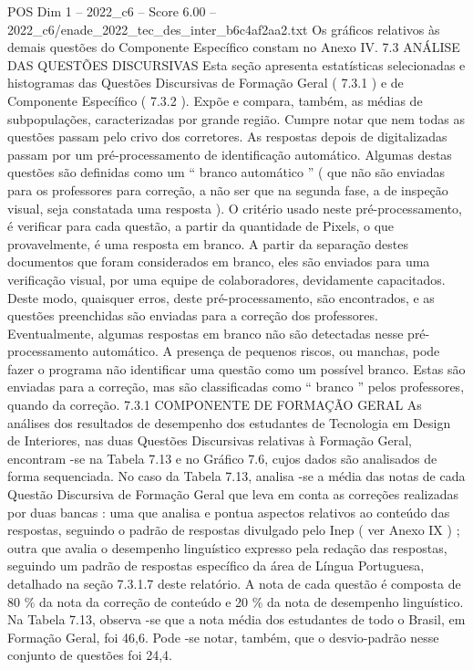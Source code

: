 \begin{textsample}{POS Dim 1 – 2022\_c6 – Score 6.00 – 2022\_c6/enade\_2022\_tec\_des\_inter\_b6c4af2aa2.txt}
Os gráficos relativos às demais questões do Componente Específico constam no Anexo IV. 7.3 ANÁLISE DAS QUESTÕES DISCURSIVAS Esta seção apresenta estatísticas selecionadas e histogramas das Questões Discursivas de Formação Geral ( 7.3.1 ) e de Componente Específico ( 7.3.2 ).
Expõe e compara, também, as médias de subpopulações, caracterizadas por grande região.
Cumpre notar que nem todas as questões passam pelo crivo dos corretores.
As respostas depois de digitalizadas passam por um pré-processamento de identificação automático.
Algumas destas questões são definidas como um “ branco automático ” ( que não são enviadas para os professores para correção, a não ser que na segunda fase, a de inspeção visual, seja constatada uma resposta ).
O critério usado neste pré-processamento, é verificar para cada questão, a partir da quantidade de Pixels, o que provavelmente, é uma resposta em branco.
A partir da separação destes documentos que foram considerados em branco, eles são enviados para uma verificação visual, por uma equipe de colaboradores, devidamente capacitados.
Deste modo, quaisquer erros, deste pré-processamento, são encontrados, e as questões preenchidas são enviadas para a correção dos professores.
Eventualmente, algumas respostas em branco não são detectadas nesse pré-processamento automático.
A presença de pequenos riscos, ou manchas, pode fazer o programa não identificar uma questão como um possível branco.
Estas são enviadas para a correção, mas são classificadas como “ branco ” pelos professores, quando da correção. 7.3.1 COMPONENTE DE FORMAÇÃO GERAL As análises dos resultados de desempenho dos estudantes de Tecnologia em Design de Interiores, nas duas Questões Discursivas relativas à Formação Geral, encontram -se na Tabela 7.13 e no Gráfico 7.6, cujos dados são analisados de forma sequenciada.
No caso da Tabela 7.13, analisa -se a média das notas de cada Questão Discursiva de Formação Geral que leva em conta as correções realizadas por duas bancas : uma que analisa e pontua aspectos relativos ao conteúdo das respostas, seguindo o padrão de respostas divulgado pelo Inep ( ver Anexo IX ) ; outra que avalia o desempenho linguístico expresso pela redação das respostas, seguindo um padrão de respostas específico da área de Língua Portuguesa, detalhado na seção 7.3.1.7 deste relatório.
A nota de cada questão é composta de 80 \% da nota da correção de conteúdo e 20 \% da nota de desempenho linguístico.
Na Tabela 7.13, observa -se que a nota média dos estudantes de todo o Brasil, em Formação Geral, foi 46,6.
Pode -se notar, também, que o desvio-padrão nesse conjunto de questões foi 24,4.

\end{textsample}

